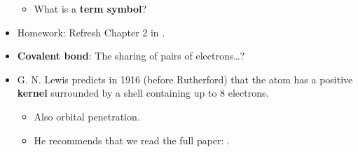 \documentclass[../notes.tex]{subfiles}
\begin{document}
\begin{itemize}
\begin{itemize}
        \item What is a \textbf{term symbol}?
    \end{itemize}
    \item Homework: Refresh Chapter 2 in \textcite{bib:MiesslerFischerTarr}.
    \item \textbf{Covalent bond}: The sharing of pairs of electrons\dots?
    \item G. N. Lewis predicts in 1916 (before Rutherford) that the atom has a positive \textbf{kernel} surrounded by a shell containing up to 8 electrons.
    \begin{itemize}
        \item Also orbital penetration.
        \item He recommends that we read the full paper: \textcite{bib:Lewis}.
    \end{itemize}
\end{itemize}
\end{document}
